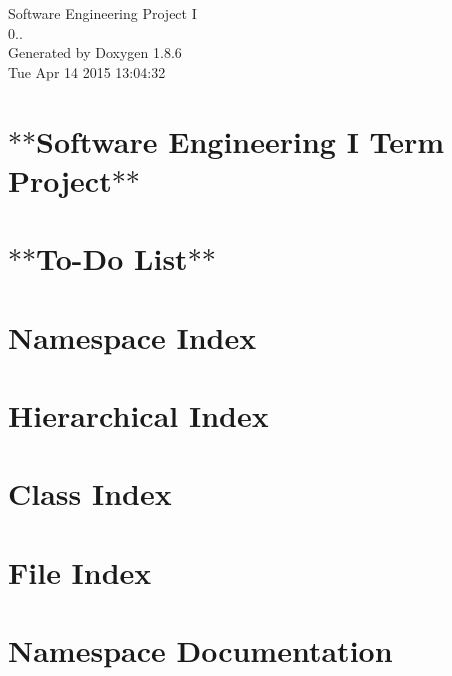 \documentclass[twoside]{book}
\newcommand{\clearemptydoublepage}{%
  \newpage{\pagestyle{empty}\cleardoublepage}%
}
\begin{document}
\hypersetup{pageanchor=false}
\begin{titlepage}
\vspace*{7cm}
\begin{center}%
{\Large Software Engineering Project I \\[1ex]\large 0.. }\\
\vspace*{1cm}
{\large Generated by Doxygen 1.8.6}\\
\vspace*{0.5cm}
{\small Tue Apr 14 2015 13:04:32}\\
\end{center}
\end{titlepage}
\clearemptydoublepage
\tableofcontents
\clearemptydoublepage
{}
\hypersetup{pageanchor=true}

\chapter{$\ast$$\ast$\-Software Engineering I Term Project$\ast$$\ast$}
\label{md__home_james_se_ws_src_sensor_admin__r_e_a_d_m_e}
\hypertarget{md__home_james_se_ws_src_sensor_admin__r_e_a_d_m_e}{}

\chapter{$\ast$$\ast$\-To-\/\-Do List$\ast$$\ast$}
\label{md__home_james_se_ws_src_sensor_admin__t_o_d_o}
\hypertarget{md__home_james_se_ws_src_sensor_admin__t_o_d_o}{}

\chapter{Namespace Index}

\chapter{Hierarchical Index}

\chapter{Class Index}

\chapter{File Index}

\chapter{Namespace Documentation}

\end{document}
